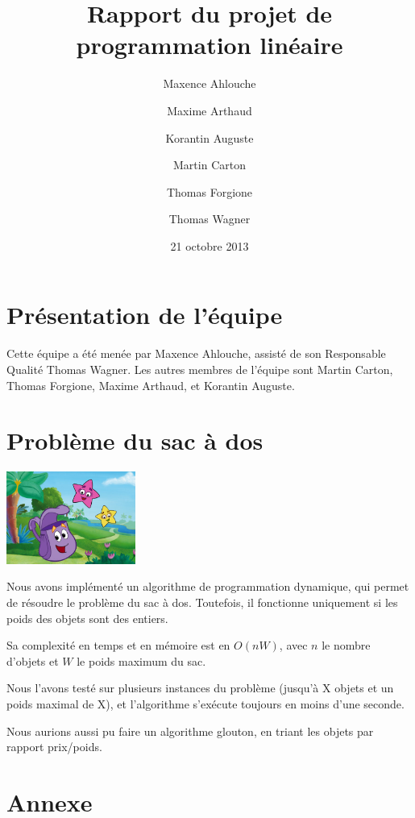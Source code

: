 \documentclass{scrartcl}
\begin{document}
\title{Rapport du projet de programmation linéaire}
\author{Maxence Ahlouche \and Maxime Arthaud \and Korantin Auguste
          \and Martin Carton \and Thomas Forgione \and Thomas Wagner}
\date{21 octobre 2013}
\maketitle
\tableofcontents
\newpage

\section{Présentation de l'équipe}
  Cette équipe a été menée par Maxence Ahlouche, assisté de son Responsable
  Qualité Thomas Wagner. Les autres membres de l'équipe sont Martin Carton,
  Thomas Forgione, Maxime Arthaud, et Korantin Auguste.

  
\section{Problème du sac à dos}
  \begin{center}\includegraphics[width=120pt]{sac_a_dos.jpg}\end{center}

  Nous avons implémenté un algorithme de programmation dynamique, qui permet de
  résoudre le problème du sac à dos.  Toutefois, il fonctionne uniquement si
  les poids des objets sont des entiers.

  Sa complexité en temps et en mémoire est en $O(nW)$, avec $n$ le nombre
  d'objets et $W$ le poids maximum du sac.

  Nous l'avons testé sur plusieurs instances du problème (jusqu'à X objets et
  un poids maximal de X), et l'algorithme s'exécute toujours en moins d'une
  seconde. %

  Nous aurions aussi pu faire un algorithme glouton, en triant les objets par
  rapport prix/poids.

\section{Annexe}
  \lstlistoflistings
  
\end{document}
